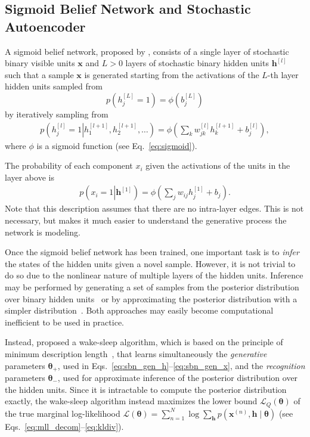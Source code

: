 \documentclass{now}
\newcommand{\qlay}[1]{\left[#1\right]}
\newcommand{\vect}[1]{\mathbf{#1}}
\newcommand{\vects}[1]{\boldsymbol{#1}}
\newcommand{\vh}[0]{\vect{h}}
\newcommand{\vx}[0]{\vect{x}}
\newcommand{\TT}[0]{{\vects{\theta}}}
\newcommand{\LL}[0]{\mathcal{L}}
\begin{document}
\subsection{Sigmoid Belief Network and Stochastic Autoencoder}
\label{sec:sbn_dbn}

A sigmoid belief network, proposed by \citet{Neal1992}, consists of a single
layer of stochastic binary visible units $\vx$ and $L > 0$ layers of stochastic
binary hidden units $\vh^{\qlay{l}}$ such that a sample $\vx$ is generated
starting from the activations of the $L$-th layer hidden units sampled from
\[
p\left(h_j^{\qlay{L}} = 1\right) = \phi\left( b_j^{\qlay{L}} \right)
\]
by iteratively sampling from 
\begin{align}
    \label{eq:sbn_gen_h}
    p\left(h_j^{\qlay{l}} = 1 \left| h_1^{\qlay{l+1}}, h_2^{\qlay{l+1}}, \dots
    \right.\right) = \phi\left( \sum_{k} w_{jk}^{\qlay{l}} h_k^{\qlay{l+1}} +
    b_j^{\qlay{l}}\right),
\end{align}
where $\phi$ is a sigmoid function (see Eq.~\eqref{eq:sigmoid}). 

The probability of each component $x_i$ given the activations of the units in
the layer above is
\begin{align}
    \label{eq:sbn_gen_x}
    p\left(x_i = 1 \left| \vh^{\qlay{1}}
    \right.\right) = \phi\left( \sum_{j} w_{ij}
    h_j^{\qlay{1}} + b_j\right).
\end{align}
Note that this description assumes that there are no intra-layer edges. This is
not necessary, but makes it much easier to understand the generative process the
network is modeling.

Once the sigmoid belief network has been trained, one important task is to
\textit{infer} the states of the hidden units given a novel sample. However, it
is not trivial to do so due to the nonlinear nature of multiple layers of the
hidden units.  Inference may be performed by generating a set of samples from
the posterior distribution over binary hidden units~\citep{Neal1992} or by
approximating the posterior distribution with a simpler distribution~\citep[see,
e.g.,][]{Saul1996,Jordan1999}. Both approaches may easily become computational
inefficient to be used in practice. 

Instead, \citet{Hinton1995} proposed a wake-sleep algorithm, which is based on
the principle of minimum description length~\citep{Rissanen1978}, that learns
simultaneously the \textit{generative} parameters $\TT_+$, used in
Eqs.~\eqref{eq:sbn_gen_h}--\eqref{eq:sbn_gen_x}, and the \textit{recognition}
parameters $\TT_-$, used for approximate inference of the posterior distribution
over the hidden units. Since it is intractable to compute the posterior
distribution exactly, the wake-sleep algorithm instead maximizes the lower bound
$\LL_Q(\TT)$ of the true marginal log-likelihood $\LL(\TT) = \sum_{n=1}^N \log
\sum_{\vh} p(\vx^{(n)}, \vh \mid \TT)$ (see
Eqs.~\eqref{eq:mll_decom}--\eqref{eq:kldiv}).
\end{document}
